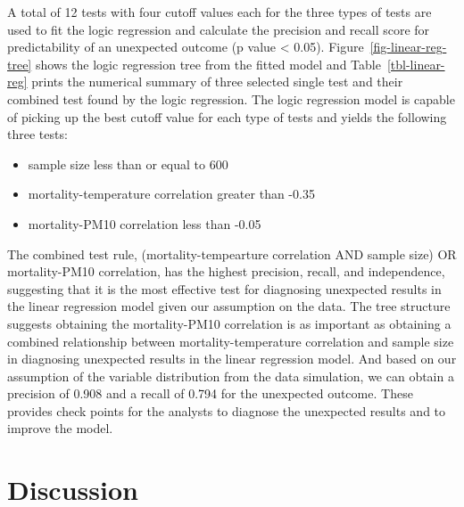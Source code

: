 \documentclass[
]{jds}
\providecommand{\tightlist}{%
  \setlength{\itemsep}{0pt}\setlength{\parskip}{0pt}}\usepackage{longtable,booktabs,array}
\begin{document}
A total of 12 tests with four cutoff values each for the three types of
tests are used to fit the logic regression and calculate the precision
and recall score for predictability of an unexpected outcome (p value
\textless{} 0.05). Figure~\ref{fig-linear-reg-tree} shows the logic
regression tree from the fitted model and Table~\ref{tbl-linear-reg}
prints the numerical summary of three selected single test and their
combined test found by the logic regression. The logic regression model
is capable of picking up the best cutoff value for each type of tests
and yields the following three tests:

\begin{itemize}
\tightlist
\item
  sample size less than or equal to 600
\item
  mortality-temperature correlation greater than -0.35
\item
  mortality-PM10 correlation less than -0.05
\end{itemize}

The combined test rule, (mortality-tempearture correlation AND sample
size) OR mortality-PM10 correlation, has the highest precision, recall,
and independence, suggesting that it is the most effective test for
diagnosing unexpected results in the linear regression model given our
assumption on the data. The tree structure suggests obtaining the
mortality-PM10 correlation is as important as obtaining a combined
relationship between mortality-temperature correlation and sample size
in diagnosing unexpected results in the linear regression model. And
based on our assumption of the variable distribution from the data
simulation, we can obtain a precision of 0.908 and a recall of 0.794 for
the unexpected outcome. These provides check points for the analysts to
diagnose the unexpected results and to improve the model.

\section{Discussion}\label{discussion}
\end{document}

